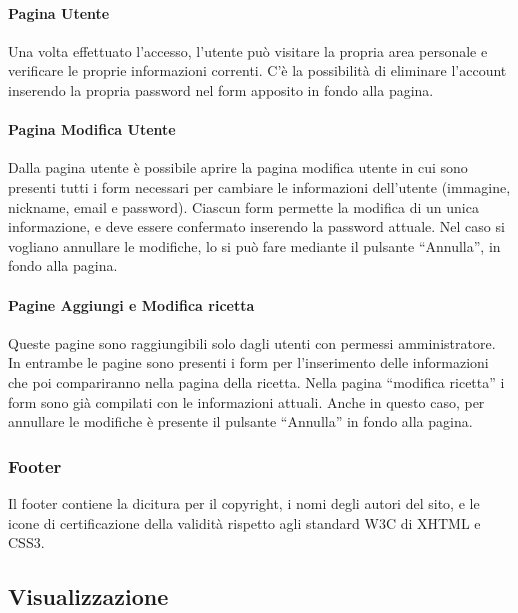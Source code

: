\paragraph{Pagina Utente}
Una volta effettuato l'accesso, l'utente può visitare la propria area personale e verificare le proprie informazioni correnti. C'è la possibilità di eliminare l'account inserendo la propria password nel form apposito in fondo alla pagina.

\paragraph{Pagina Modifica Utente}
Dalla pagina utente è possibile aprire la pagina modifica utente in cui sono presenti tutti i form necessari per cambiare le informazioni dell'utente (immagine, nickname, email e password). Ciascun form permette la modifica di un unica informazione, e deve essere confermato inserendo la password attuale. Nel caso si vogliano annullare le modifiche, lo si può fare mediante il pulsante ``Annulla'', in fondo alla pagina.

\paragraph{Pagine Aggiungi e Modifica ricetta}
Queste pagine sono raggiungibili solo dagli utenti con permessi amministratore. In entrambe le pagine sono presenti i form per l'inserimento delle informazioni che poi compariranno nella pagina della ricetta. Nella pagina ``modifica ricetta'' i form sono già compilati con le informazioni attuali. Anche in questo caso, per annullare le modifiche è presente il pulsante ``Annulla'' in fondo alla pagina.

\subsubsection{Footer}
\label{ssub:footer}
Il footer contiene la dicitura per il copyright, i nomi degli autori del sito, e le icone di certificazione della validità rispetto agli standard W3C di XHTML e CSS3.

\subsection{Visualizzazione} %
\label{sub:visualizzazione}

